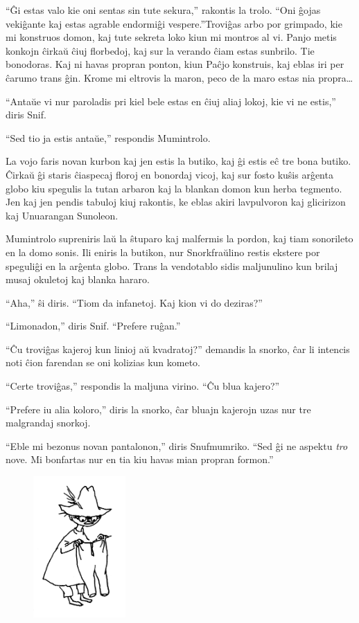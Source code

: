 ``Ĝi estas valo kie oni sentas sin tute sekura,'' rakontis la trolo. ``Oni ĝojas vekiĝante kaj estas agrable endormiĝi vespere.''Troviĝas arbo por grimpado, kie mi konstruos domon, kaj tute sekreta loko kiun mi montros al vi. Panjo metis konkojn ĉirkaŭ ĉiuj florbedoj, kaj sur la verando ĉiam estas sunbrilo. Tie bonodoras. Kaj ni havas propran ponton, kiun Paĉjo konstruis, kaj eblas iri per ĉarumo trans ĝin. Krome mi eltrovis la maron, peco de la maro estas nia propra{\ldots}

``Antaŭe vi nur paroladis pri kiel bele estas en ĉiuj aliaj lokoj, kie vi ne estis,'' diris Snif.

``Sed tio ja estis antaŭe,'' respondis Mumintrolo.

La vojo faris novan kurbon kaj jen estis la butiko, kaj ĝi estis eĉ tre bona butiko. Ĉirkaŭ ĝi staris ĉiaspecaj floroj en bonordaj vicoj, kaj sur fosto kuŝis arĝenta globo kiu spegulis la tutan arbaron kaj la blankan domon kun herba tegmento. Jen kaj jen pendis tabuloj kiuj rakontis, ke eblas akiri lavpulvoron kaj glicirizon kaj Unuarangan Sunoleon.

Mumintrolo supreniris laŭ la ŝtuparo kaj malfermis la pordon, kaj tiam sonorileto en la domo sonis. Ili eniris la butikon, nur Snorkfraŭlino restis ekstere por speguliĝi en la arĝenta globo. Trans la vendotablo sidis maljunulino kun brilaj musaj okuletoj kaj blanka hararo.

``Aha,'' ŝi diris. ``Tiom da infanetoj. Kaj kion vi do deziras?''

``Limonadon,'' diris Snif. ``Prefere ruĝan.''

``Ĉu troviĝas kajeroj kun linioj aŭ kvadratoj?'' demandis la snorko, ĉar li intencis noti ĉion farendan se oni kolizias kun kometo.

``Certe troviĝas,'' respondis la maljuna virino. ``Ĉu blua kajero?''

``Prefere iu alia koloro,'' diris la snorko, ĉar bluajn kajerojn uzas nur tre malgrandaj snorkoj.

``Eble mi bezonus novan pantalonon,'' diris Snufmumriko. ``Sed ĝi ne aspektu \emph{tro} nove. Mi bonfartas nur en tia kiu havas mian propran formon.''

\begin{figure}[htbp]
\centering
\includegraphics[width=100pt,height=153pt]{6-3.png}
\caption{}
\label{6-3}
\end{figure}

